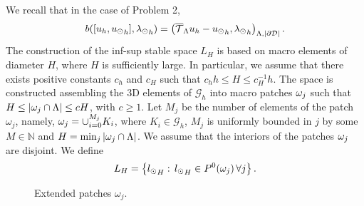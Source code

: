 We recall that in the case of Problem 2, 
\begin{equation*}
b([u_h, {u_{\odot}}_h], {\lambda_{\odot}}_h) = \left({\overline{\mathcal{T}}_\Lambda} u_h - {u_{\odot}}_h, {\lambda_{\odot}}_h\right)_{\Lambda,|\partial\mathcal{D}|}.
\end{equation*}
The construction of the inf-sup stable space $L_H$ is based on macro elements of diameter $H$, where $H$ is sufficiently large. In particular, we assume that there exists positive constants $c_h$ and $c_H$ such that $c_h h\leq H \leq c_H^{-1}h$. The space is constructed assembling the 3D elements of $\mathcal{G}_h$ into macro patches $ \omega _j $ such that $H \leq |\omega _j\cap \Lambda|\leq cH$, with $c\geq 1$. Let $M_j$ be the number of elements of the patch $\omega_j$, namely, $\omega _j=\cup _{i=0}^{M_j} K_i$, where $K_i \in \mathcal{G}_h$, $M_j$ is uniformly bounded in $j$ by some $M\in \mathbb{N}$ and $H=\min_{j}|\omega _j\cap \Lambda|$. We assume that the interiors of the patches $\omega _j$ are  disjoint. We define 
\begin{equation*}
L_H=\left\{{l_{\odot} }_H: \, {l_{\odot} }_H\in P^0(\omega _j)\, \forall j \right\}.
\end{equation*}

\begin{figure}\label{fig:patch}
\center

\caption{Extended patches $\omega_j$.}
\end{figure}

